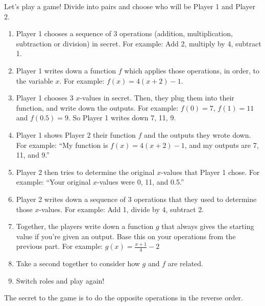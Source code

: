 \documentclass[noauthor,noinstructornotes]{ximera}
\begin{document}
\begin{problem}
Let's play a game! Divide into pairs and choose who will be
Player 1 and Player 2. 

\begin{enumerate}
    \item Player 1 chooses a sequence of 3 operations (addition, 
    multiplication, subtraction or division) in secret. For example: Add 2, multiply by 4, subtract 1.
    \item Player 1 writes down a function \(f\) which applies those operations,
    in order, to the variable \(x\). For example: \(f(x) = 4(x + 2) - 1\).
    \item Player 1 chooses 3 \(x\)-values in secret. Then, they plug them into their function,
    and write down the outputs. For example: \(f(0) = 7\), \(f(1) = 11\) and \(f(0.5) = 9\). So Player 1
        writes down 7, 11, 9.
    \item Player 1 shows Player 2 their function \(f\) and the outputs they wrote down.
    For example: ``My function is \(f(x) = 4(x + 2) - 1\), and my outputs are 7, 11, and 9.''
    \item Player 2 then tries to determine the original \(x\)-values that
    Player 1 chose. For example: ``Your original \(x\)-values were 0, 11, and 0.5.''
    \item Player 2 writes down a sequence of 3 operations that they
    used to determine those \(x\)-values. For example: Add 1, divide by 4, subtract 2.
    \item Together, the players write down a function \(g\) that always gives the 
    starting value if you're given an output. Base this on your operations
    from the previous part. For example: \(g(x) = \frac{x + 1}{4} - 2\)
    \item Take a second together to consider how \(g\) and \(f\) are related. 
    \item Switch roles and play again!
\end{enumerate}

\begin{explanation}
The secret to the game is to do the opposite operations in the reverse order.
\end{explanation}
\end{problem}
\end{document}

